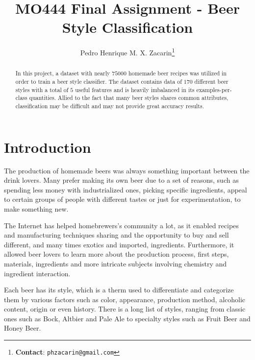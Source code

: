 \documentclass[10pt,twocolumn,letterpaper]{article}
\begin{document}
\title{MO444 Final Assignment - Beer Style Classification}
\author{Pedro Henrique M. X. Zacarin\thanks{\textbf{Contact}: \tt\small{phzacarin@gmail.com}}\\
}

\maketitle
\begin{abstract}
In this project, a dataset with nearly $75000$ homemade beer recipes was utilized in order to train a beer style classifier. The dataset contains data of $170$ different beer styles with a total of $5$ useful features and is heavily imbalanced in its examples-per-class quantities. Allied to the fact that many beer styles shares common attributes, classification may be difficult and may not provide great accuracy results.
\end{abstract}

\section{Introduction}
The production of homemade beers was always something important between the drink lovers. Many prefer making its own beer due to a set of reasons, such as spending less money with industrialized ones, picking specific ingredients, appeal to certain groups of people with different tastes or just for experimentation, to make something new.

The Internet has helped homebrewers's community a lot, as it enabled recipes and manufacturing techniques sharing and the opportunity to buy and sell different, and many times exotics and imported, ingredients. Furthermore, it allowed beer lovers to learn more about the production process, first steps, materials, ingredients and more intricate subjects involving chemistry and ingredient interaction.

Each beer has its style, which is a therm used to differentiate and categorize them by various factors such as color, appearance, production method, alcoholic content, origin or even history. There is a long list of styles, ranging from classic ones such as Bock, Altbier and Pale Ale to specialty styles such as Fruit Beer and Honey Beer.
\end{document}

